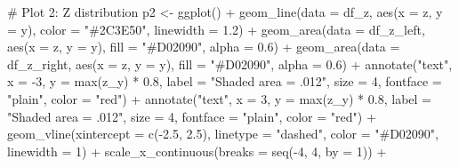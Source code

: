 \documentclass[
  letterpaper,
  DIV=11,
  numbers=noendperiod]{scrreprt}
\newenvironment{Shaded}{\begin{snugshade}}{\end{snugshade}}
\newcommand{\AttributeTok}[1]{\textcolor[rgb]{0.40,0.45,0.13}{#1}}
\newcommand{\CommentTok}[1]{\textcolor[rgb]{0.37,0.37,0.37}{#1}}
\newcommand{\DecValTok}[1]{\textcolor[rgb]{0.68,0.00,0.00}{#1}}
\newcommand{\FloatTok}[1]{\textcolor[rgb]{0.68,0.00,0.00}{#1}}
\newcommand{\FunctionTok}[1]{\textcolor[rgb]{0.28,0.35,0.67}{#1}}
\newcommand{\NormalTok}[1]{\textcolor[rgb]{0.00,0.23,0.31}{#1}}
\newcommand{\OtherTok}[1]{\textcolor[rgb]{0.00,0.23,0.31}{#1}}
\newcommand{\SpecialCharTok}[1]{\textcolor[rgb]{0.37,0.37,0.37}{#1}}
\newcommand{\StringTok}[1]{\textcolor[rgb]{0.13,0.47,0.30}{#1}}
\begin{document}
\begin{Shaded}
\begin{Highlighting}[]
\CommentTok{\# Plot 2: Z distribution}
\NormalTok{p2 }\OtherTok{\textless{}{-}} \FunctionTok{ggplot}\NormalTok{() }\SpecialCharTok{+}
  \FunctionTok{geom\_line}\NormalTok{(}\AttributeTok{data =}\NormalTok{ df\_z, }\FunctionTok{aes}\NormalTok{(}\AttributeTok{x =}\NormalTok{ z, }\AttributeTok{y =}\NormalTok{ y), }
            \AttributeTok{color =} \StringTok{"\#2C3E50"}\NormalTok{, }\AttributeTok{linewidth =} \FloatTok{1.2}\NormalTok{) }\SpecialCharTok{+}
  \FunctionTok{geom\_area}\NormalTok{(}\AttributeTok{data =}\NormalTok{ df\_z\_left, }\FunctionTok{aes}\NormalTok{(}\AttributeTok{x =}\NormalTok{ z, }\AttributeTok{y =}\NormalTok{ y),}
            \AttributeTok{fill =} \StringTok{"\#D02090"}\NormalTok{, }\AttributeTok{alpha =} \FloatTok{0.6}\NormalTok{) }\SpecialCharTok{+}
  \FunctionTok{geom\_area}\NormalTok{(}\AttributeTok{data =}\NormalTok{ df\_z\_right, }\FunctionTok{aes}\NormalTok{(}\AttributeTok{x =}\NormalTok{ z, }\AttributeTok{y =}\NormalTok{ y),}
            \AttributeTok{fill =} \StringTok{"\#D02090"}\NormalTok{, }\AttributeTok{alpha =} \FloatTok{0.6}\NormalTok{) }\SpecialCharTok{+}
  \FunctionTok{annotate}\NormalTok{(}\StringTok{"text"}\NormalTok{, }\AttributeTok{x =} \SpecialCharTok{{-}}\DecValTok{3}\NormalTok{, }\AttributeTok{y =} \FunctionTok{max}\NormalTok{(z\_y) }\SpecialCharTok{*} \FloatTok{0.8}\NormalTok{,}
           \AttributeTok{label =} \StringTok{"Shaded area = .012"}\NormalTok{,}
           \AttributeTok{size =} \DecValTok{4}\NormalTok{, }\AttributeTok{fontface =} \StringTok{"plain"}\NormalTok{, }\AttributeTok{color =} \StringTok{"red"}\NormalTok{) }\SpecialCharTok{+}
  \FunctionTok{annotate}\NormalTok{(}\StringTok{"text"}\NormalTok{, }\AttributeTok{x =} \DecValTok{3}\NormalTok{, }\AttributeTok{y =} \FunctionTok{max}\NormalTok{(z\_y) }\SpecialCharTok{*} \FloatTok{0.8}\NormalTok{,}
           \AttributeTok{label =} \StringTok{"Shaded area = .012"}\NormalTok{,}
           \AttributeTok{size =} \DecValTok{4}\NormalTok{, }\AttributeTok{fontface =} \StringTok{"plain"}\NormalTok{, }\AttributeTok{color =} \StringTok{"red"}\NormalTok{) }\SpecialCharTok{+}
  \FunctionTok{geom\_vline}\NormalTok{(}\AttributeTok{xintercept =} \FunctionTok{c}\NormalTok{(}\SpecialCharTok{{-}}\FloatTok{2.5}\NormalTok{, }\FloatTok{2.5}\NormalTok{), }\AttributeTok{linetype =} \StringTok{"dashed"}\NormalTok{, }
             \AttributeTok{color =} \StringTok{"\#D02090"}\NormalTok{, }\AttributeTok{linewidth =} \DecValTok{1}\NormalTok{) }\SpecialCharTok{+}
  \FunctionTok{scale\_x\_continuous}\NormalTok{(}\AttributeTok{breaks =} \FunctionTok{seq}\NormalTok{(}\SpecialCharTok{{-}}\DecValTok{4}\NormalTok{, }\DecValTok{4}\NormalTok{, }\AttributeTok{by =} \DecValTok{1}\NormalTok{)) }\SpecialCharTok{+}

\end{Highlighting}
\end{Shaded}
\end{document}
